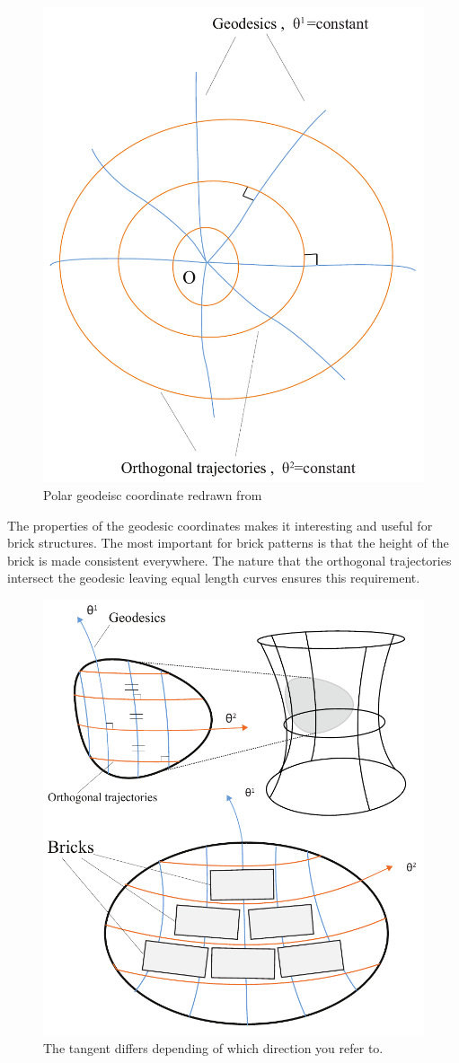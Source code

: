 \begin{figure}[H]
\centering
\includegraphics[width=0.7\linewidth ]{figure/Theory/polarGeo.pdf}
\caption{Polar geodeisc coordinate redrawn from \cite{ref:Struik} }
\label{fig:polargeo}
\end{figure}

The properties of the geodesic coordinates makes it interesting and useful for brick structures. The most important for brick patterns is that the height of the brick is made consistent everywhere. The nature that the orthogonal trajectories intersect the geodesic leaving equal length curves ensures this requirement. 

\begin{figure}[H]
\centering
\includegraphics[height=0.8\linewidth ]{figure/Theory/GeodesicBrick.pdf}
\caption{The tangent differs depending of which direction you refer to. }
\end{figure}



